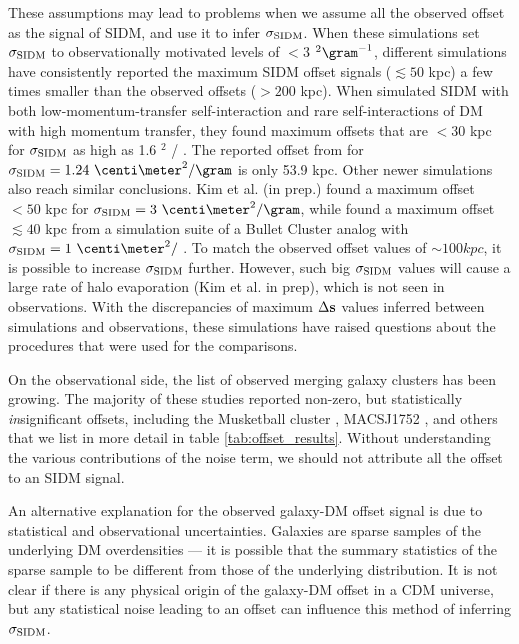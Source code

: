 These assumptions may lead to problems when we assume all the observed offset
as the signal of SIDM, and use it to infer $\sigma_{\rm SIDM}$.  
When these simulations set $\sigma_{\rm SIDM}$ to observationally motivated 
levels of $< 3$ \centi\meter$^2 \gram^{-1}$, 
different simulations have consistently reported the maximum SIDM offset signals ($\lesssim
50$ kpc) a few times smaller than the observed offsets ($ > 200$ kpc). 
When \cite{Kahlhoefer14} simulated SIDM with both low-momentum-transfer 
self-interaction 
and rare self-interactions of DM with high momentum transfer, they found maximum 
offsets that are $< 30$ kpc for $\sigma_{\rm SIDM}$ as high as 1.6
\centi\meter$^2$ / \gram.
The reported offset from \cite{Randall2008d}
for $\sigmaSIDM = 1.24~\centi\meter^2 / \gram$ is only 53.9 kpc. 
Other newer simulations also reach similar conclusions.
Kim et al. (in prep.) found a maximum offset $< 50$ kpc for 
$\sigmaSIDM = 3~\centi\meter^2 / \gram$, while
\cite{Robertson2016} found a maximum offset $\lesssim 40$ kpc  
 from a simulation suite of a Bullet Cluster analog 
 with $\sigmaSIDM = 1~\centi\meter^2 /$ \gram.
To match the observed offset values of $\sim 100 kpc$, it is possible 
to increase $\sigma_{\rm SIDM}$ further. However, such big $\sigma_{\rm SIDM}$ values will
cause a large rate of halo evaporation (Kim et al. in prep), which is not seen
in observations.
With the discrepancies of maximum $\Delta {\bf s}$ values inferred between simulations and observations,
these simulations have raised questions about the procedures that were used for
the comparisons.

On the observational side, the list of observed merging galaxy 
clusters has been growing.
The majority of these studies reported non-zero,
but statistically {\it in}significant offsets, including the Musketball cluster
\citep{Dawson2013}, MACSJ1752 \citep{Jee2015}, 
and others that we list in more detail in table \ref{tab:offset_results}.
Without understanding the various contributions of the noise term, 
we should not attribute all the offset to an SIDM signal. 

An alternative explanation for the observed galaxy-DM offset signal is due to 
statistical and observational uncertainties. Galaxies are
sparse samples of the underlying DM overdensities --- it is possible that the 
summary statistics of the sparse sample to be different from those of the 
underlying distribution. It is not clear if there is any physical
origin of the galaxy-DM offset in a CDM universe, 
but any statistical noise leading to an offset can influence this method of 
inferring $\sigma_{\rm SIDM}$. 

